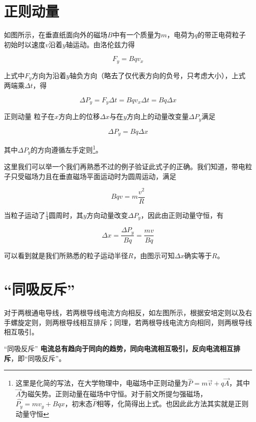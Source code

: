 \section{正则动量}


如图所示，在垂直纸面向外的磁场$B$中有一个质量为$m$，电荷为$q$的带正电荷粒子初始时以速度$v$沿着$y$轴运动。由洛伦兹力得

$$F_y = B q v_x$$

上式中$F_y$方向为沿着$y$轴负方向（略去了仅代表方向的负号，只考虑大小），上式两端乘$\Delta t$，得

$$\Delta P_y = F_y \Delta t = B q v_x \Delta t = B q \Delta x$$

\begin{theo}{正则动量}{}
粒子在$x$方向上的位移$\Delta x$与在$y$方向上的动量改变量$\Delta P_y$满足

$$\Delta P_y = B q \Delta x$$

其中$\Delta P_y$的方向遵循左手定则\footnote{这里是化简的写法，在大学物理中，电磁场中正则动量为$\hat{P} = m \vec{v} + q \vec{A}$，其中$\vec{A}$为磁矢势。正则动量在磁场中守恒。对于前文所提匀强磁场，$\hat{P_y} = m v_y + B q x$，初末态$\hat{P}$相等，化简得出上式。也因此此方法其实就是正则动量守恒}。

\end{theo}

这里我们可以举一个我们再熟悉不过的例子验证此式子的正确。我们知道，带电粒子只受磁场力且在垂直磁场平面运动时为圆周运动，满足

$$B q v = m \frac{v^2}{R}$$

当粒子运动了$\frac{1}{4}$圆周时，其$y$方向动量改变$\Delta P_y$，因此由正则动量守恒，有

$$\Delta x = \frac{\Delta P_y}{B q} = \frac{m v}{B q}$$

可以看到就是我们所熟悉的粒子运动半径$R$，由图示可知$\Delta x$确实等于$R$。

\section{“同吸反斥”}



对于两根通电导线，若两根导线电流方向相反，如左图所示，根据安培定则以及右手螺旋定则，则两根导线相互排斥；同理，若两根导线电流方向相同，则两根导线相互吸引。

\begin{theo}{“同吸反斥”}{}
\textbf{电流总有趋向于同向的趋势，同向电流相互吸引，反向电流相互排斥}，即“同吸反斥”。
\end{theo}

